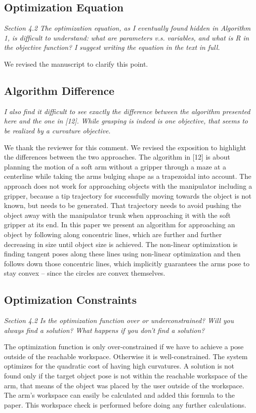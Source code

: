 \documentclass[letterpaper, 10 pt, twocolumn, conference]{article}
\begin{document}
\subsection{Optimization Equation}
\textit{Section 4.2 The optimization equation, as I eventually found hidden in Algorithm 1, is difficult to understand: what are parameters v.s. variables, and what is R in the objective function? I suggest writing the equation in the text in full.}

We revised the manuscript to clarify this point. 

\subsection{Algorithm Difference}
\textit{I also find it difficult to see exactly the difference between the algorithm presented here and the one in [12]. While grasping is indeed is one objective, that seems to be realized by a curvature objective.} 

We thank the reviewer for this comment. We revised the exposition to highlight the differences between the two approaches. The algorithm in [12] is about planning the motion of a soft arm without a gripper through a maze at a centerline while taking the arms bulging shape as a trapezoidal into account. The approach does not work for approaching objects with the manipulator including a gripper, because a tip trajectory for successfully moving towards the object is not known, but needs to be generated. That trajectory needs to avoid pushing the object away with the manipulator trunk when approaching it with the soft gripper at its end. In this paper we present an algorithm for approaching an object by following along concentric lines, which are further and further decreasing in size until object size is achieved. The non-linear optimization is finding tangent poses along these lines using non-linear optimization and then follows down those concentric lines, which implicitly guarantees the arms pose to stay convex – since the circles are convex themselves.

\subsection{Optimization Constraints}
\textit{Section 4.2 Is the optimization function over or underconstrained? Will you always find a solution? What happens if you don’t find a solution?}

The optimization function is only over-constrained if we have to achieve a pose outside of the reachable workspace. Otherwise it is well-constrained. The system optimizes for the quadratic cost of having high curvatures. A solution is not found only if the target object pose is not within the reachable workspace of the arm, that means of the object was placed by the user outside of the workspace. The arm’s workspace can easily be calculated and added this formula to the paper. This workspace check is performed before doing any further calculations.
\end{document}
